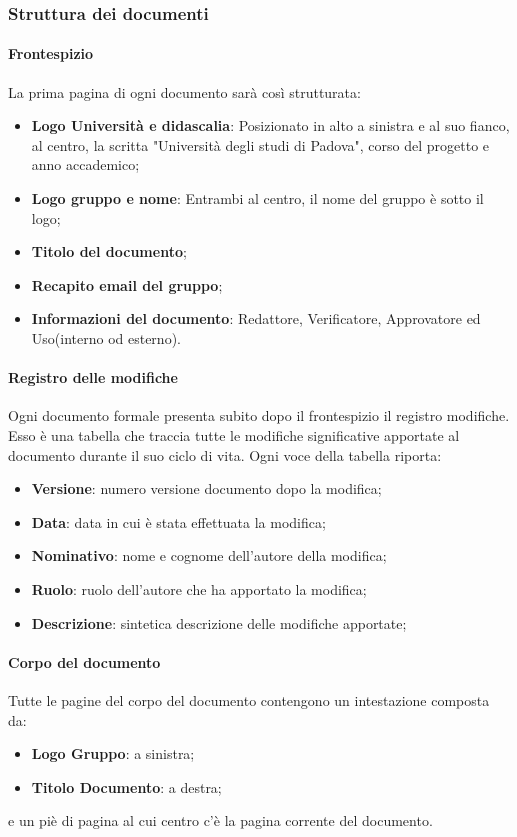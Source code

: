 	\subsubsection{Struttura dei documenti}
		\paragraph{Frontespizio}
		\aCapo{}    
			La prima pagina di ogni documento sarà così strutturata:
				\begin{itemize}
					\item \textbf{Logo Università e didascalia}: Posizionato in alto a sinistra e al suo fianco, al centro, la scritta "Università degli studi di Padova", corso del progetto e anno accademico;
					\item \textbf{Logo gruppo e nome}: Entrambi al centro, il nome del gruppo è sotto il logo;
					\item \textbf{Titolo del documento};
					\item \textbf{Recapito email del gruppo};
					\item \textbf{Informazioni del documento}: Redattore, Verificatore, Approvatore ed Uso(interno od esterno).
				\end{itemize}
			
		\paragraph{Registro delle modifiche}
		\aCapo{}  
			Ogni documento formale presenta subito dopo il frontespizio il registro modifiche. 
			Esso è una tabella che traccia tutte le modifiche significative apportate al documento durante il suo ciclo di vita. Ogni voce della tabella riporta:
				\begin{itemize}
					\item \textbf{Versione}: numero versione documento dopo la modifica;
					\item \textbf{Data}: data in cui è stata effettuata la modifica;
					\item \textbf{Nominativo}: nome e cognome dell'autore della modifica;
					\item \textbf{Ruolo}: ruolo dell'autore che ha apportato la modifica;
					\item \textbf{Descrizione}: sintetica descrizione delle modifiche apportate;
				\end{itemize}
	
		\paragraph{Corpo del documento}      
		\aCapo{}   
			Tutte le pagine del corpo del documento contengono un intestazione composta da:
				\begin{itemize}
					\item \textbf{Logo Gruppo}: a sinistra;
					\item \textbf{Titolo Documento}: a destra;
				\end{itemize}
			e un piè di pagina al cui centro c'è la pagina corrente del documento.
			
